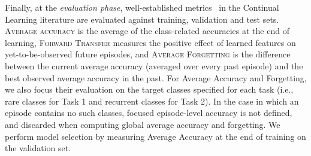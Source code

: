 %
Finally, at the \textit{evaluation phase}, well-established metrics~\cite{mai2022online} in the Continual Learning literature are evaluated against training, validation and test sets.
\textsc{Average accuracy} is the average of the class-related accuracies at the end of learning, \textsc{Forward Transfer} measures the positive effect of learned features on yet-to-be-observed future episodes, and \textsc{Average Forgetting} is the difference between the current average accuracy (averaged over every past episode) and the best observed average accuracy in the past.
For Average Accuracy and Forgetting, we also focus their evaluation on the target classes specified for each task (i.e., rare classes for Task 1 and recurrent classes for Task 2). In the case in which an episode contains no such classes, focused episode-level accuracy is not defined, and discarded when computing global average accuracy and forgetting.
We perform model selection by measuring Average Accuracy at the end of training on the validation set.


